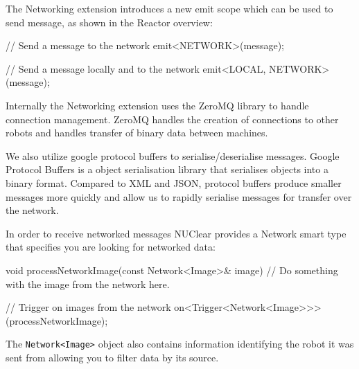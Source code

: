 \documentclass[english,12pt]{scrartcl}
\begin{document}
				The Networking extension introduces a new emit scope which can be used to send message, as shown in the Reactor overview:

				\begin{cppcode}
					// Send a message to the network
					emit<NETWORK>(message);

					// Send a message locally and to the network
					emit<LOCAL, NETWORK>(message);
				\end{cppcode}

				Internally the Networking extension uses the ZeroMQ library to handle connection management.
				ZeroMQ handles the creation of connections to other robots and handles transfer of binary data between machines.

				We also utilize google protocol buffers to serialise/deserialise messages.
				Google Protocol Buffers is a object serialisation library that serialises objects into a binary format.
				Compared to XML and JSON, protocol buffers produce smaller messages more quickly and allow us to rapidly serialise messages for transfer over the network.

				In order to receive networked messages NUClear provides a Network smart type that specifies you are looking for networked data:

				\begin{cppcode}
					void processNetworkImage(const Network<Image>& image) {
					    // Do something with the image from the network here.
					}

					// Trigger on images from the network
					on<Trigger<Network<Image>>>(processNetworkImage);
				\end{cppcode}

				The \texttt{Network<Image>} object also contains information identifying the robot it was sent from allowing you to filter data by its source.
\end{document}
